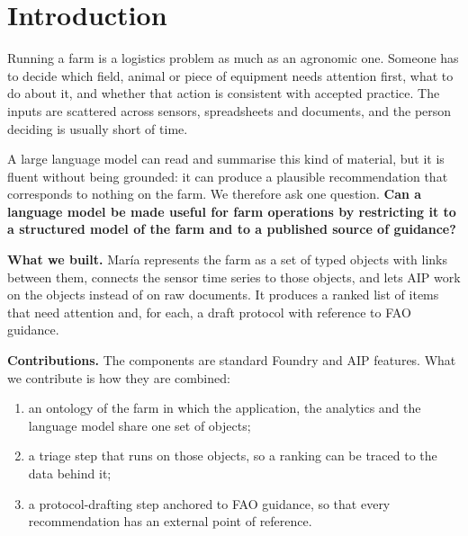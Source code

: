 \documentclass[11pt,letterpaper]{article}
\begin{document}


\section{Introduction}
Running a farm is a logistics problem as much as an agronomic one. Someone has to decide which field, animal or piece of equipment needs attention first, what to do about it, and whether that action is consistent with accepted practice. The inputs are scattered across sensors, spreadsheets and documents, and the person deciding is usually short of time.

A large language model can read and summarise this kind of material, but it is fluent without being grounded: it can produce a plausible recommendation that corresponds to nothing on the farm. We therefore ask one question. \textbf{Can a language model be made useful for farm operations by restricting it to a structured model of the farm and to a published source of guidance?}

\textbf{What we built.} Mar\'ia represents the farm as a set of typed objects with links between them, connects the sensor time series to those objects, and lets AIP work on the objects instead of on raw documents. It produces a ranked list of items that need attention and, for each, a draft protocol with reference to FAO guidance.

\textbf{Contributions.} The components are standard Foundry and AIP features. What we contribute is how they are combined:
\begin{enumerate}
\item an ontology of the farm in which the application, the analytics and the language model share one set of objects;
\item a triage step that runs on those objects, so a ranking can be traced to the data behind it;
\item a protocol-drafting step anchored to FAO guidance, so that every recommendation has an external point of reference.
\end{enumerate}
\end{document}
